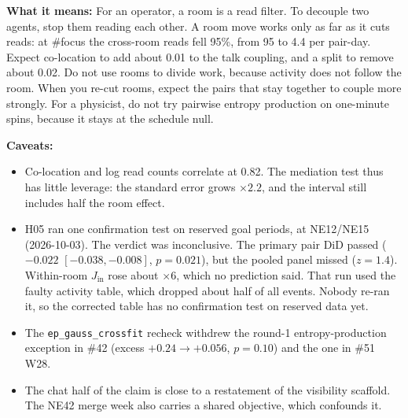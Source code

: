 \textbf{What it means:} For an operator, a room is a read filter. To decouple two agents, stop them reading each other. A room move works only as far as it cuts reads: at \#focus the cross-room reads fell 95\%, from 95 to 4.4 per pair-day. Expect co-location to add about 0.01 to the talk coupling, and a split to remove about 0.02. Do not use rooms to divide work, because activity does not follow the room. When you re-cut rooms, expect the pairs that stay together to couple more strongly. For a physicist, do not try pairwise entropy production on one-minute spins, because it stays at the schedule null.

\textbf{Caveats:}
\begin{itemize}\setlength{\itemsep}{0pt}\setlength{\parskip}{0pt}
\item Co-location and log read counts correlate at 0.82. The mediation test thus has little leverage: the standard error grows $\times2.2$, and the interval still includes half the room effect.
\item H05 ran one confirmation test on reserved goal periods, at NE12/NE15 (2026-10-03). The verdict was inconclusive. The primary pair DiD passed ($-0.022$ $[-0.038,-0.008]$, $p=0.021$), but the pooled panel missed ($z=1.4$). Within-room $J_\mathrm{in}$ rose about $\times6$, which no prediction said. That run used the faulty activity table, which dropped about half of all events. Nobody re-ran it, so the corrected table has no confirmation test on reserved data yet.
\item The \texttt{ep\_gauss\_crossfit} recheck withdrew the round-1 entropy-production exception in \#42 (excess $+0.24\to+0.056$, $p=0.10$) and the one in \#51 W28.
\item The chat half of the claim is close to a restatement of the visibility scaffold. The NE42 merge week also carries a shared objective, which confounds it.
\end{itemize}
